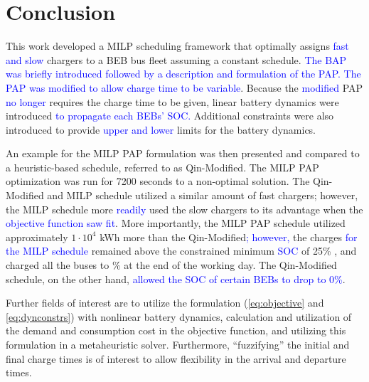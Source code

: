\documentclass[utf8]{FrontiersinHarvard}
\newcommand{\bcharge}{0.7 }                                                     %
\newcommand{\mincharge}{25\% }                                                  %
\newcommand{\timeran}{7200 }                                                    %
\begin{document}
\section{Conclusion}
\label{sec:conclusion}
This work developed a MILP scheduling framework that optimally assigns \textcolor{blue}{fast and slow}
chargers to a BEB bus fleet assuming a constant schedule. \textcolor{blue}{The BAP was briefly introduced followed by a description and formulation of the PAP.} \textcolor{blue}{The PAP was modified to allow charge time to be variable}. Because the \textcolor{blue}{modified} PAP \textcolor{blue}{no longer}
requires the charge time to be given, linear battery dynamics were introduced \textcolor{blue}{to propagate each BEBs' SOC.} Additional constraints were also introduced to provide \textcolor{blue}{upper and lower}
limits for the battery dynamics.

An example for the MILP PAP formulation was then presented and compared to a heuristic-based schedule, referred to as
Qin-Modified. The MILP PAP optimization was run for \timeran seconds to a non-optimal solution. The Qin-Modified and
MILP schedule utilized a similar amount of fast chargers; however, the MILP schedule more
\textcolor{blue}{readily} used the slow chargers to its advantage when the
\textcolor{blue}{objective function saw fit}. More importantly, the MILP PAP schedule utilized approximately
\(1\cdot10^4\) kWh more than the Qin-Modified\textcolor{blue}{; however,} the charges \textcolor{blue}{for the MILP schedule} remained above the constrained minimum \textcolor{blue}{SOC} of \mincharge, and charged all the
buses to \fpeval{\bcharge *100}\% at the end of the working day. The Qin-Modified schedule, on the other hand,
\textcolor{blue}{allowed the SOC of certain BEBs to drop to 0\%}.

Further fields of interest are to utilize the formulation (\autoref{eq:objective} and \autoref{eq:dynconstrs}) with
nonlinear battery dynamics, calculation and utilization of the demand and consumption cost in the objective function,
and utilizing this formulation in a metaheuristic solver. Furthermore, ``fuzzifying'' the initial and final charge times
is of interest to allow flexibility in the arrival and departure times.




\nolinenumbers
\clearpage
\end{document}
